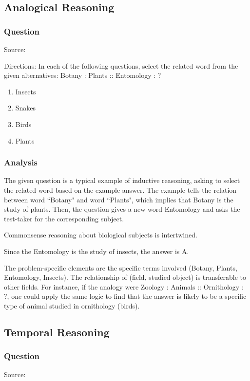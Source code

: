 \documentclass[12pt, a4paper]{article}
\begin{document}
\subsection*{Analogical Reasoning}
\subsubsection*{Question}
Source: \cite{Gajanand_2022b}

Directions: In each of the following questions, select the related word from the given alternatives: Botany : Plants :: Entomology : ?

\begin{enumerate}[label=(\Alph*)]
    \item Insects
    \item Snakes
    \item Birds
    \item Plants
\end{enumerate}

\subsubsection*{Analysis}
The given question is a typical example of inductive reasoning, asking to select the related word based on the example answer. The example tells the relation between word ``Botany" and word ``Plants", which implies that Botany is the study of plants. Then, the question gives a new word Entomology and asks the test-taker for the corresponding subject.

Commonsense reasoning about biological subjects is intertwined.

Since the Entomology is the study of insects, the answer is A.

The problem-specific elements are the specific terms involved (Botany, Plants, Entomology, Insects). The relationship of (field, studied object) is transferable to other fields. For instance, if the analogy were Zoology : Animals :: Ornithology : ?, one could apply the same logic to find that the answer is likely to be a specific type of animal studied in ornithology (birds).

\subsection*{Temporal Reasoning}
\subsubsection*{Question}
Source: \cite{Singh_2020}
\end{document}
